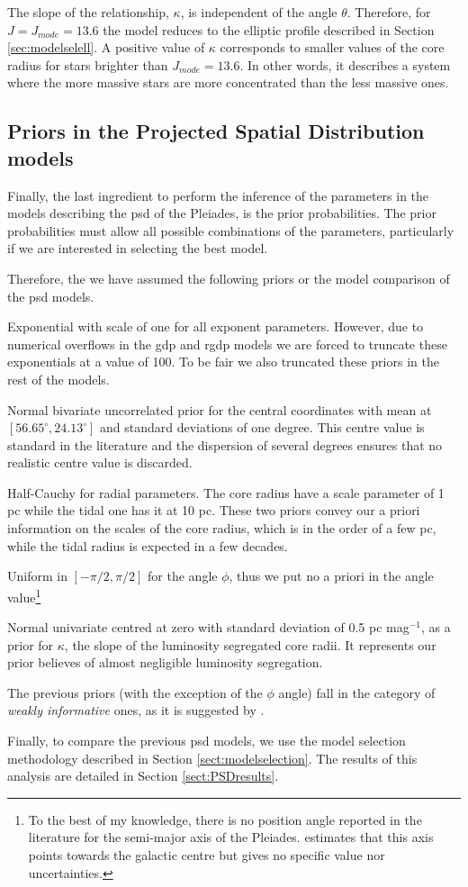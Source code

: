 The slope of the relationship, $\kappa$, is independent of the angle
$\theta$. Therefore, for $J=J_{mode}=13.6$ the
model reduces to the elliptic profile described in Section
\ref{sec:modelselell}. A positive value of $\kappa$ corresponds to
smaller values of the core radius for stars brighter than $J_{mode}=13.6$. In
other words, it describes a system where the more massive stars are
more concentrated than the less massive ones.

\subsection{Priors in the Projected Spatial Distribution models}
Finally, the last ingredient to perform the inference of the parameters in the models describing the \gls{psd} of the Pleiades, is the prior probabilities.
The prior probabilities must allow all possible combinations of the parameters, particularly if we are interested in selecting the best model. 

Therefore, the we have assumed the following priors or the model comparison of the \gls{psd} models.

Exponential with scale of one for all exponent parameters. However, due to numerical overflows in the \gls{gdp} and \gls{rgdp} models we are forced to truncate these exponentials at a value of 100. To be fair we also truncated these priors in the rest of the models.

Normal bivariate uncorrelated prior for the central coordinates with mean at $[56.65^\circ,24.13^\circ]$ and standard deviations of one degree. This centre value is standard in the literature \cite[e.g.][]{Bouy2015} and the dispersion of several degrees ensures that no realistic centre value is discarded.

Half-Cauchy for radial parameters. The core radius have a scale parameter of 1 pc while the tidal one has it at 10 pc. These two priors convey our a priori information on the scales of the core radius, which is in the order of a few pc, while the tidal radius is expected in a few decades. 

Uniform in $[-\pi/2,\pi/2]$ for the angle $\phi$, thus we put no a priori in the angle value\footnote{To the best of my knowledge, there is no position angle reported in the literature for the semi-major axis of the Pleiades. \citet{Raboud1998} estimates that this axis points towards the galactic centre but gives no specific value nor uncertainties.}

Normal univariate centred at zero with standard deviation of  0.5 pc mag$^{-1}$, as a prior for $\kappa$, the slope of the luminosity segregated core radii. It represents our prior believes of almost negligible luminosity segregation.

The previous priors (with the exception of the $\phi$ angle) fall in the category of \emph{weakly informative} ones, as it is suggested by  \citet{Gelman2006}.

Finally, to compare the previous \gls{psd} models, we use the model selection methodology described in Section \ref{sect:modelselection}. The results of this analysis are detailed in Section \ref{sect:PSDresults}.



